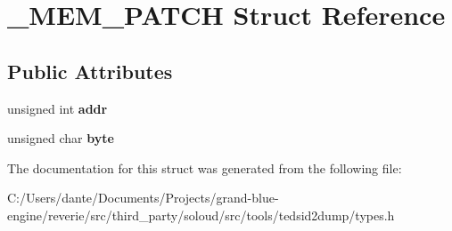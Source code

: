 \hypertarget{struct___m_e_m___p_a_t_c_h}{}\section{\+\_\+\+M\+E\+M\+\_\+\+P\+A\+T\+CH Struct Reference}
\label{struct___m_e_m___p_a_t_c_h}
\subsection*{Public Attributes}
\begin{DoxyCompactItemize}
\item 
\mbox{\label{struct___m_e_m___p_a_t_c_h_a54a1b992f5e70c40f2b5fe24a4d77506}} 
unsigned int {\bfseries addr}
\item 
\mbox{\label{struct___m_e_m___p_a_t_c_h_a78af5c10b958152a3b54abde0bbd5d82}} 
unsigned char {\bfseries byte}
\end{DoxyCompactItemize}


The documentation for this struct was generated from the following file\+:\begin{DoxyCompactItemize}
\item 
C\+:/\+Users/dante/\+Documents/\+Projects/grand-\/blue-\/engine/reverie/src/third\+\_\+party/soloud/src/tools/tedsid2dump/types.\+h\end{DoxyCompactItemize}
